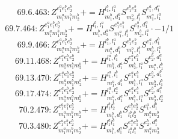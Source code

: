 \documentclass[letterpaper,10pt,fleqn,leqno,onecolumn]{article}
\begin{document}
\begin{equation} \;\;\;\;\;\;  69.6.463: Z^{e_{1}^{a}e_{1}^{b}e_{2}^{b}}_{m_{1}^{a}m_{1}^{b}m_{2}^{b}}+=H^{l_{1}^{b},l_{1}^{a}}_{m_{1}^{b},d_{1}^{a}}S^{e_{1}^{b}e_{2}^{b}}_{m_{2}^{b},l_{1}^{b}}S^{e_{1}^{a},d_{1}^{a}}_{m_{1}^{a},l_{1}^{a}} \end{equation}
\begin{equation} \;\;\;\;\;\;  69.7.464: Z^{e_{1}^{a}e_{1}^{b}e_{2}^{b}}_{m_{1}^{a}m_{1}^{b}m_{2}^{b}}+=H^{l_{1}^{b},l_{1}^{a}}_{m_{1}^{b},d_{1}^{a}}S^{e_{1}^{a}e_{1}^{b}}_{m_{1}^{a},l_{1}^{b}}S^{e_{2}^{b},d_{1}^{a}}_{m_{2}^{b},l_{1}^{a}}\cdot -1/1 \end{equation}
\begin{equation} \;\;\;\;\;\;  69.9.466: Z^{e_{1}^{a}e_{1}^{b}e_{2}^{b}}_{m_{1}^{a}m_{1}^{b}m_{2}^{b}}+=H^{l_{1}^{b},l_{1}^{a}}_{m_{1}^{a},d_{1}^{b}}S^{e_{1}^{b}e_{2}^{b}}_{m_{1}^{b},l_{1}^{b}}S^{e_{1}^{a},d_{1}^{b}}_{m_{2}^{b},l_{1}^{a}} \end{equation}
\begin{equation} \;\;\;\;\;\;  69.11.468: Z^{e_{1}^{a}e_{1}^{b}e_{2}^{b}}_{m_{1}^{a}m_{1}^{b}m_{2}^{b}}+=H^{l_{1}^{a},l_{1}^{b}}_{m_{1}^{b},d_{1}^{a}}S^{e_{1}^{a}e_{1}^{b}}_{m_{2}^{b},l_{1}^{a}}S^{e_{2}^{b},d_{1}^{a}}_{m_{1}^{a},l_{1}^{b}} \end{equation}
\begin{equation} \;\;\;\;\;\;  69.13.470: Z^{e_{1}^{a}e_{1}^{b}e_{2}^{b}}_{m_{1}^{a}m_{1}^{b}m_{2}^{b}}+=H^{l_{1}^{a},l_{1}^{b}}_{m_{1}^{a},d_{1}^{b}}S^{e_{1}^{a}e_{1}^{b}}_{m_{1}^{b},l_{1}^{a}}S^{e_{2}^{b},d_{1}^{b}}_{m_{2}^{b},l_{1}^{b}} \end{equation}
\begin{equation} \;\;\;\;\;\;  69.17.474: Z^{e_{1}^{a}e_{1}^{b}e_{2}^{b}}_{m_{1}^{a}m_{1}^{b}m_{2}^{b}}+=H^{l_{1}^{a},l_{2}^{a}}_{m_{1}^{a},d_{1}^{a}}S^{e_{1}^{a}e_{1}^{b}}_{m_{1}^{b},l_{1}^{a}}S^{e_{2}^{b},d_{1}^{a}}_{m_{2}^{b},l_{2}^{a}} \end{equation}
\begin{equation} \;\;\;\;\;\;  70.2.479: Z^{e_{1}^{a}e_{1}^{b}e_{2}^{b}}_{m_{1}^{a}m_{1}^{b}m_{2}^{b}}+=H^{l_{1}^{b}l_{2}^{b}}_{m_{1}^{b},d_{1}^{b}}S^{e_{1}^{b}e_{2}^{b}}_{l_{1}^{b}l_{2}^{b}}S^{e_{1}^{a},d_{1}^{b}}_{m_{1}^{a}m_{2}^{b}} \end{equation}
\begin{equation} \;\;\;\;\;\;  70.3.480: Z^{e_{1}^{a}e_{1}^{b}e_{2}^{b}}_{m_{1}^{a}m_{1}^{b}m_{2}^{b}}+=H^{l_{1}^{a}l_{1}^{b}}_{m_{1}^{b},d_{1}^{a}}S^{e_{1}^{a}e_{1}^{b}}_{l_{1}^{a}l_{1}^{b}}S^{e_{2}^{b},d_{1}^{a}}_{m_{1}^{a}m_{2}^{b}} \end{equation}
\end{document}
